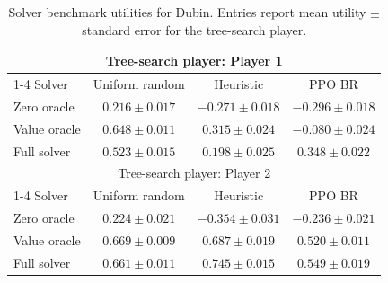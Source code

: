 \begin{table}[t]
\centering
\caption{Solver benchmark utilities for Dubin. Entries report mean utility $\pm$ standard error for the tree-search player.}
\label{tab:dubin-solver-benchmarks}
\begin{tabular}{@{}lccc@{}}
\toprule
\multicolumn{4}{c}{Tree-search player: Player 1} \\
\cmidrule(lr){1-4}
Solver & Uniform random & Heuristic & PPO BR \\
\midrule
Zero oracle & $0.216 \pm 0.017$ & $-0.271 \pm 0.018$ & $-0.296 \pm 0.018$ \\
Value oracle & $\mathbf{0.648 \pm 0.011}$ & $\mathbf{0.315 \pm 0.024}$ & $-0.080 \pm 0.024$ \\
Full solver & $0.523 \pm 0.015$ & $0.198 \pm 0.025$ & $\mathbf{0.348 \pm 0.022}$ \\
\midrule
\multicolumn{4}{c}{Tree-search player: Player 2} \\
\cmidrule(lr){1-4}
Solver & Uniform random & Heuristic & PPO BR \\
\midrule
Zero oracle & $0.224 \pm 0.021$ & $-0.354 \pm 0.031$ & $-0.236 \pm 0.021$ \\
Value oracle & $\mathbf{0.669 \pm 0.009}$ & $0.687 \pm 0.019$ & $0.520 \pm 0.011$ \\
Full solver & $0.661 \pm 0.011$ & $\mathbf{0.745 \pm 0.015}$ & $\mathbf{0.549 \pm 0.019}$ \\
\bottomrule
\end{tabular}
\end{table}
